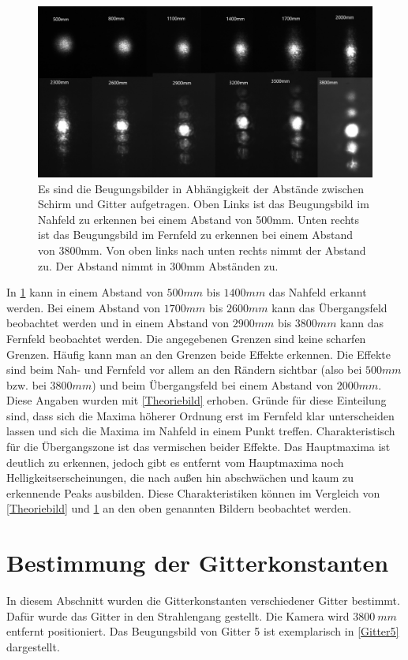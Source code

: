 \begin{figure}[h!]
	\centering
	\includegraphics[scale = 0.65]{alleabstande.png}
	\caption{Es sind die Beugungsbilder in Abhängigkeit der Abstände zwischen Schirm und Gitter aufgetragen. Oben Links ist das Beugungsbild im Nahfeld zu erkennen bei einem Abstand von 500mm. Unten rechts ist das Beugungsbild im Fernfeld zu erkennen bei einem Abstand von 3800mm. Von oben links nach unten rechts nimmt der Abstand zu. Der Abstand nimmt in 300mm Abständen zu.}
	\label{alle}
\end{figure}
In \cref{alle} kann in einem Abstand von $500 mm$ bis $1400 mm$ das Nahfeld erkannt werden. Bei einem Abstand von $1700 mm$ bis $2600 mm$  kann das Übergangsfeld beobachtet werden und in einem Abstand von $2900 mm$ bis $3800 mm$ kann das Fernfeld beobachtet werden. Die angegebenen Grenzen sind keine scharfen Grenzen. Häufig kann man an den Grenzen beide Effekte erkennen. Die Effekte sind beim Nah- und Fernfeld vor allem an den Rändern sichtbar (also bei $500 mm$ bzw. bei $3800 mm$) und beim Übergangsfeld bei einem Abstand von $2000 mm$. Diese Angaben wurden mit \cref{Theoriebild} erhoben. Gründe für diese Einteilung sind, dass sich die Maxima höherer Ordnung erst im Fernfeld klar unterscheiden lassen und sich die Maxima im Nahfeld in einem Punkt treffen. Charakteristisch für die Übergangszone ist das vermischen beider Effekte. Das Hauptmaxima ist deutlich zu erkennen, jedoch gibt es entfernt vom Hauptmaxima noch Helligkeitserscheinungen, die nach außen hin abschwächen und kaum zu erkennende Peaks ausbilden. Diese Charakteristiken können im Vergleich von \cref{Theoriebild} und \cref{alle} an den oben genannten Bildern beobachtet werden.

\section{Bestimmung der Gitterkonstanten}
In diesem Abschnitt wurden die Gitterkonstanten verschiedener Gitter bestimmt. Dafür wurde das Gitter in den Strahlengang gestellt. Die Kamera wird $\SI{3800}{mm}$ entfernt positioniert. Das Beugungsbild von Gitter 5 ist exemplarisch in \cref{Gitter5} dargestellt.

